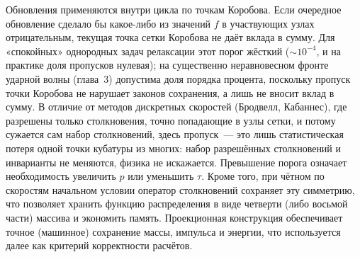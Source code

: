 Обновления применяются внутри цикла по точкам Коробова.
Если очередное обновление сделало бы какое-либо из значений $f$ в участвующих узлах отрицательным, текущая точка сетки
Коробова не даёт вклада в сумму.
Для «спокойных» однородных задач релаксации этот порог жёсткий ($\sim10^{-4}$, и на практике доля пропусков нулевая); на
существенно неравновесном фронте ударной волны (глава~3) допустима доля порядка процента, поскольку пропуск точки
Коробова не нарушает законов сохранения, а лишь не вносит вклад в сумму.
В отличие от методов дискретных скоростей (Бродвелл, Кабаннес), где разрешены только столкновения, точно попадающие в
узлы сетки, и потому сужается сам набор столкновений, здесь пропуск~--- это лишь статистическая потеря одной точки
кубатуры из многих: набор разрешённых столкновений и инварианты не меняются, физика не искажается.
Превышение порога означает необходимость увеличить $p$ или уменьшить $\tau$.
Кроме того, при чётном по скоростям начальном условии оператор столкновений сохраняет эту симметрию, что позволяет
хранить функцию распределения в виде четверти (либо восьмой части) массива и экономить память.
Проекционная конструкция обеспечивает точное (машинное) сохранение массы, импульса и энергии, что используется далее как
критерий корректности расчётов.
